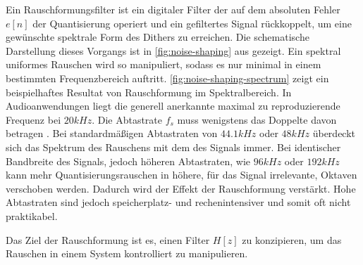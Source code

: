 Ein Rauschformungsfilter ist ein digitaler Filter der auf dem absoluten Fehler $e[n]$ der Quantisierung operiert und ein gefiltertes Signal rückkoppelt, um eine gewünschte spektrale Form des Dithers zu erreichen.
Die schematische Darstellung dieses Vorgangs ist in \autoref{fig:noise-shaping} aus \autocite[S. 148]{noise-shaping} gezeigt.
Ein spektral uniformes Rauschen wird so manipuliert, sodass es nur minimal in einem bestimmten Frequenzbereich auftritt.
\autoref{fig:noise-shaping-spectrum} zeigt ein beispielhaftes Resultat von Rauschformung im Spektralbereich.
In Audioanwendungen liegt die generell anerkannte maximal zu reproduzierende Frequenz bei $20\si{kHz}$.
Die Abtastrate $f_s$ muss wenigstens das Doppelte davon betragen \autocite[S. 11 f.]{shannon}.
Bei standardmäßigen Abtastraten von $44.1\si{kHz}$ oder $48\si{kHz}$ überdeckt sich das Spektrum des Rauschens mit dem des Signals immer.
Bei identischer Bandbreite des Signals, jedoch höheren Abtastraten, wie $96\si{kHz}$ oder $192\si{kHz}$ kann mehr Quantisierungsrauschen in höhere, für das Signal irrelevante, Oktaven verschoben werden.
Dadurch wird der Effekt der Rauschformung verstärkt.
Hohe Abtastraten sind jedoch speicherplatz- und rechenintensiver und somit oft nicht praktikabel.

Das Ziel der Rauschformung ist es, einen Filter $H[z]$ zu konzipieren, um das Rauschen in einem System kontrolliert zu manipulieren.

